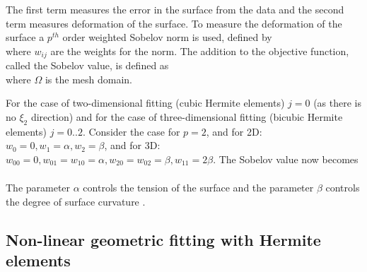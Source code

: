 The first term measures the error in the surface from the data and the second
term measures deformation of the surface. To measure the deformation of the
surface a $p^{th}$ order weighted Sobelov norm 
\cite{terzopoulos:1986,tikhonov:1977} is used, defined by
\begin{equation}
  \label{eqn:Sobnorm}
\end{equation}
where $w_{ij}$ are the weights for the norm. The addition to the objective
function, called the Sobelov value, is defined as
\begin{equation}
  \label{eqn:Sobvalue}
\end{equation}
where $\Omega$ is the mesh domain.

For the case of two-dimensional fitting (\ie cubic Hermite elements) $j=0$
(as there is no $\xi_{2}$ direction) and for the case of three-dimensional
fitting (\ie bicubic Hermite elements) $j=0..2$. Consider the case for $p=2$,
and for 2D: $w_{0}=0, w_{1}=\alpha, w_{2}=\beta$, and for 3D: $w_{00}=0,
w_{01}=w_{10}=\alpha, w_{20}=w_{02}= \beta, w_{11}=2\beta$. The Sobelov value
now becomes
\begin{equation}
  \begin{array}{lllll}
  \end{array}
  \label{eqn:ptwoSobnorm}
\end{equation}

The parameter $\alpha$ controls the tension of the surface and the parameter
$\beta$ controls the degree of surface curvature
\cite{terzopoulos:1986}.

\subsection{Non-linear geometric fitting with Hermite elements}


